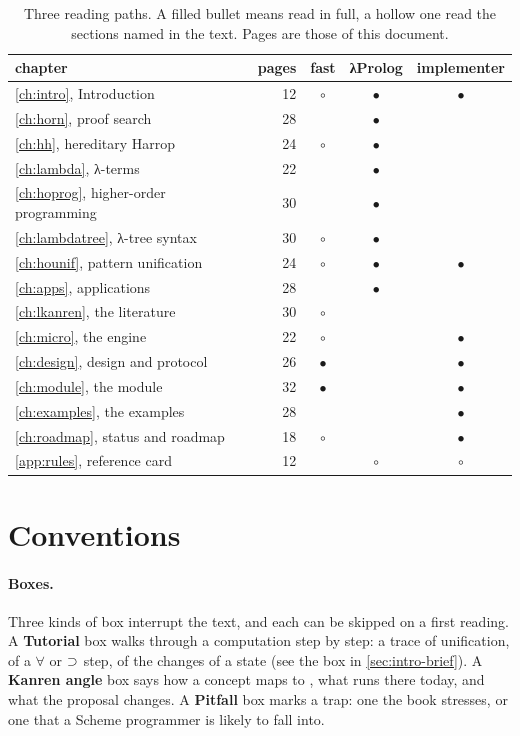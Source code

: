 \begin{table}[htb]
\centering\small
\caption{Three reading paths. A filled bullet means read in full, a hollow one read the sections named in
the text. Pages are those of this document.}\label{tab:intro-paths}
\begin{tabular}{@{}lrccc@{}}
\toprule
chapter & pages & fast & λProlog & implementer\\
\midrule
\cref{ch:intro}, Introduction & 12 & $\circ$ & $\bullet$ & $\bullet$\\
\cref{ch:horn}, proof search & 28 & & $\bullet$ & \\
\cref{ch:hh}, hereditary Harrop & 24 & $\circ$ & $\bullet$ & \\
\cref{ch:lambda}, λ-terms & 22 & & $\bullet$ & \\
\cref{ch:hoprog}, higher-order programming & 30 & & $\bullet$ & \\
\cref{ch:lambdatree}, λ-tree syntax & 30 & $\circ$ & $\bullet$ & \\
\cref{ch:hounif}, pattern unification & 24 & $\circ$ & $\bullet$ & $\bullet$\\
\cref{ch:apps}, applications & 28 & & $\bullet$ & \\
\cref{ch:lkanren}, the literature & 30 & $\circ$ & & \\
\cref{ch:micro}, the engine & 22 & $\circ$ & & $\bullet$\\
\cref{ch:design}, design and protocol & 26 & $\bullet$ & & $\bullet$\\
\cref{ch:module}, the module & 32 & $\bullet$ & & $\bullet$\\
\cref{ch:examples}, the examples & 28 & & & $\bullet$\\
\cref{ch:roadmap}, status and roadmap & 18 & $\circ$ & & $\bullet$\\
\cref{app:rules}, reference card & 12 & & $\circ$ & $\circ$\\
\bottomrule
\end{tabular}
\end{table}


\section{Conventions}\label{sec:intro-conventions}

\paragraph{Boxes.} Three kinds of box interrupt the text, and each can be skipped on a first reading.
A \textbf{Tutorial} box walks through a computation step by step: a trace of unification, of a $\forall$ or
$\supset$ step, of the changes of a state (see the box in \cref{sec:intro-brief}). A \textbf{Kanren angle} box
says how a concept maps to \micro, what runs there today, and what the proposal changes. A \textbf{Pitfall}
box marks a trap: one the book stresses, or one that a Scheme programmer is likely to fall into.

